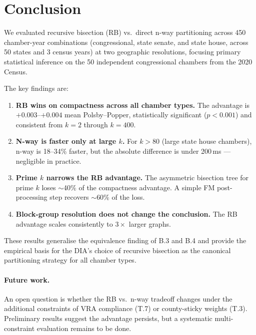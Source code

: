 \section{Conclusion}
\label{sec:conclusion}

We evaluated recursive bisection (RB) vs.\ direct n-way partitioning
across 450 chamber-year combinations (congressional, state senate, and
state house, across 50 states and 3 census years) at two geographic
resolutions, focusing primary statistical inference on the 50 independent
congressional chambers from the 2020 Census.

The key findings are:

\begin{enumerate}
  \item \textbf{RB wins on compactness across all chamber types.}
    The advantage is $+0.003$--$+0.004$ mean Polsby--Popper, statistically
    significant ($p < 0.001$) and consistent from $k = 2$ through $k = 400$.
  \item \textbf{N-way is faster only at large $k$.}
    For $k > 80$ (large state house chambers), n-way is 18--34\% faster,
    but the absolute difference is under 200\,ms --- negligible in practice.
  \item \textbf{Prime $k$ narrows the RB advantage.}
    The asymmetric bisection tree for prime $k$ loses $\sim$40\% of the
    compactness advantage.  A simple FM post-processing step recovers $\sim$60\%
    of the loss.
  \item \textbf{Block-group resolution does not change the conclusion.}
    The RB advantage scales consistently to $3\times$ larger graphs.
\end{enumerate}

These results generalise the equivalence finding of B.3 and B.4 and
provide the empirical basis for the DIA's choice of recursive bisection
as the canonical partitioning strategy for all chamber types.

\paragraph{Future work.}
An open question is whether the RB vs.\ n-way tradeoff changes under
the additional constraints of VRA compliance (T.7) or county-sticky
weights (T.3).  Preliminary results suggest the advantage persists, but
a systematic multi-constraint evaluation remains to be done.
